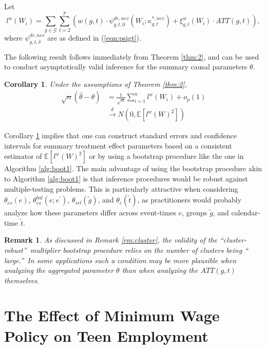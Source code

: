 \documentclass[11pt]{article}%
\theoremstyle{plain}
\newtheorem{corollary}{Corollary}
\newtheorem{remark}{Remark}
\numberwithin{sassumption}{section}
\numberwithin{equation}{section}
\begin{document}
Let%
\[
l^{w}\left(  W_{i}\right)  =\sum_{g\in\mathcal{G}}\sum_{t=2}^{\mathcal{T}%
}\left(  w\left(  g,t\right)  \cdot\psi_{g,t,0}^{dr,nev}(W_{i};\kappa
_{g,t}^{\ast,nev})+\xi_{g,t}^{w}(W_{i})\cdot ATT(g,t)\right)  ,
\]
where $\psi_{g,t,\delta}^{dr,nev}$ are as defined in (\ref{eqn:psigt}).

The following result follows immediately from Theorem \ref{thm:2}, and can be
used to conduct asymptotically valid inference for the summary causal
parameters $\theta$.

\begin{corollary}
\label{cor:1} Under the assumptions of Theorem \ref{thm:2},%
\begin{align*}
\sqrt{n}(\hat{\theta}-\theta)  &  =\frac{1}{\sqrt{n}}\sum_{i=1}^{n}%
l^{w}\left(  W_{i}\right)  +o_{p}(1)\\
&  \xrightarrow{d}N\left(  0,\mathbb{E}\left[  l^{w}\left(  W\right)
^{2}\right]  \right)
\end{align*}

\end{corollary}

Corollary \ref{cor:1} implies that one can construct standard errors and
confidence intervals for summary treatment effect parameters based on a
consistent estimator of $\mathbb{E}\left[  l^{w}\left(  W\right)  ^{2}\right]
$ or by using a bootstrap procedure like the one in Algorithm \ref{alg:boot1}.
The main advantage of using the bootstrap procedure akin to Algorithm
\ref{alg:boot1} is that inference procedures would be robust against
multiple-testing problems. This is particularly attractive when considering
$\theta_{es}(e)$, $\theta_{es}^{bal}(e;e^{\prime})$, $\theta_{sel}(\tilde{g}%
)$, and $\theta_{c}\left(  \tilde{t}\right)  $, as practitioners would
probably analyze how these parameters differ across event-times $e$, groups
$\tilde{g}$, and calendar-time $\tilde{t}$.

\begin{remark}
\label{rm:cluster2} As discussed in Remark \ref{rm:cluster}, the validity of
the \textquotedblleft cluster-robust\textquotedblright\ multiplier bootstrap
procedure relies on the number of clusters being \textquotedblleft
large.\textquotedblright\ In some applications such a condition may be more
plausible when analyzing the aggregated parameter $\theta$ than when analyzing
the $ATT(g,t)$ themselves.
\end{remark}

\section{The Effect of Minimum Wage Policy on Teen Employment}
\end{document}
